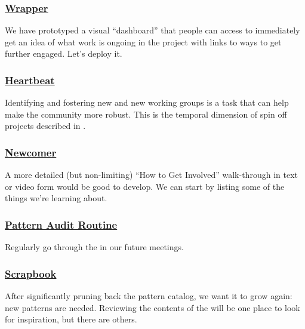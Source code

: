 \subsubsection*{\hyperref[sec:Wrapper]{Wrapper}}
We have prototyped a visual ``dashboard'' that people can access to immediately get an idea of what work is ongoing in the project with links to ways to get further engaged.  Let's deploy it.

\subsubsection*{\hyperref[sec:Heartbeat]{Heartbeat}} Identifying and fostering new  and new working groups is a task that can help make the community more robust.  This is the temporal dimension of spin off projects described in .

\subsubsection*{\hyperref[sec:Newcomer]{Newcomer}} A more detailed (but non-limiting) ``How to Get Involved'' walk-through in text or video form would be good to develop. We can start by listing some of the things we're learning about.

\subsubsection*{\hyperref[sec:Pattern_Audit_Routine]{Pattern Audit Routine}} Regularly go through the  in our future meetings.

\subsubsection*{\hyperref[sec:Scrapbook]{Scrapbook}} After significantly pruning back the pattern catalog, we want it to grow again: new patterns are needed.  Reviewing the contents of the  will be one place to look for inspiration, but there are others.




